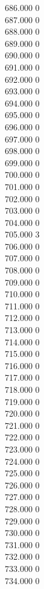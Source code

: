 { 686.000	0 \\
 687.000	0 \\
 688.000	0 \\
 689.000	0 \\
 690.000	0 \\
 691.000	0 \\
 692.000	0 \\
 693.000	0 \\
 694.000	0 \\
 695.000	0 \\
 696.000	0 \\
 697.000	0 \\
 698.000	0 \\
 699.000	0 \\
 700.000	0 \\
 701.000	0 \\
 702.000	0 \\
 703.000	0 \\
 704.000	0 \\
 705.000	3 \\
 706.000	0 \\
 707.000	0 \\
 708.000	0 \\
 709.000	0 \\
 710.000	0 \\
 711.000	0 \\
 712.000	0 \\
 713.000	0 \\
 714.000	0 \\
 715.000	0 \\
 716.000	0 \\
 717.000	0 \\
 718.000	0 \\
 719.000	0 \\
 720.000	0 \\
 721.000	0 \\
 722.000	0 \\
 723.000	0 \\
 724.000	0 \\
 725.000	0 \\
 726.000	0 \\
 727.000	0 \\
 728.000	0 \\
 729.000	0 \\
 730.000	0 \\
 731.000	0 \\
 732.000	0 \\
 733.000	0 \\
 734.000	0 \\
}

